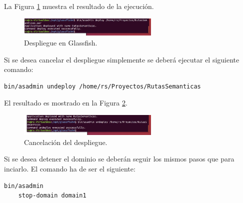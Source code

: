 La Figura \ref{deploy} muestra el resultado de la ejecución.
\begin{figure}[h]
  \centering
    \includegraphics[width=0.6\textwidth]{../img/glass/despliegue.jpg}
  \caption{Despliegue en Glassfish.}
  \label{deploy}
\end{figure}

Si se desea cancelar el despliegue simplemente se deberá ejecutar el siguiente comando:

\begin{lstlisting}[language=bash]
	bin/asadmin undeploy /home/rs/Proyectos/RutasSemanticas
\end{lstlisting}

El resultado es mostrado en la Figura \ref{undeploy}.

\begin{figure}[h]
  \centering
    \includegraphics[width=0.6\textwidth]{../img/glass/undeploy.jpg}
  \caption{Cancelación del despliegue.}
  \label{undeploy}
\end{figure}

Si se desea detener el dominio se deberán seguir los mismos pasos que para inciarlo. El comando ha de ser el siguiente:

\begin{lstlisting}[language=bash]
	bin/asadmin
	stop-domain domain1		
\end{lstlisting}